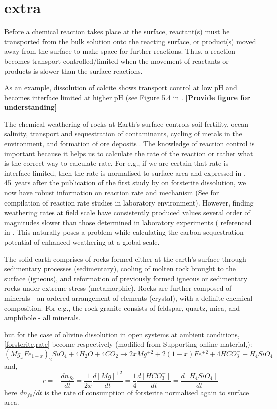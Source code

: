 \chapter{extra}
Before a chemical reaction takes place at the surface, reactant(s) must be transported from the bulk solution onto the reacting surface, or product(s) moved away from the surface to make space for further reactions. Thus, a reaction becomes transport controlled/limited when the movement of reactants or products is slower than the surface reactions.

As an example, dissolution of calcite shows transport control at low pH and becomes interface limited at higher pH (see Figure 5.4 in \cite{Brantley2008b}. \textbf{ [Provide figure for understanding]}

The chemical weathering of rocks at Earth's surface controls soil fertility, ocean salinity, transport and sequestration of contaminants, cycling of metals in the environment, and formation of ore deposits \citep{hellmann2012}.
The knowledge of reaction control is important because it helps us to calculate the rate of the reaction or rather what is the correct way to calculate rate. For e.g., if we are certain that rate is interface limited, then the rate is normalised to surface area and expressed in \citep{Brantley2008c}. \SI{45}{years} after the publication of the first study by \cite{luce1972} on forsterite dissolution, we now have robust information on reaction rate and mechanism (See \cite{rimstidt2012} for compilation of reaction rate studies in laboratory environment). However, finding weathering rates at field scale have consistently produced values several order of magnitudes slower than those determined in laboratory experiments (\cite{white1995} referenced in \citep{renforth2015}. This naturally poses a problem while calculating the carbon sequestration potential of enhanced weathering at a global scale.  

The solid earth comprises of rocks formed either at the earth's surface through sedimentary processes (sedimentary), cooling of molten rock brought to the surface (igneous), and reformation of previously formed igneous or sedimentary rocks under extreme stress (metamorphic). Rocks are further composed of minerals - an ordered arrangement of elements (crystal), with a definite chemical composition. For e.g., the rock granite consists of feldspar, quartz, mica, and amphibole - all minerals.

but for the case of olivine dissolution in open systems at ambient conditions, \cref{forsterite,rate} become respectively (modified from Supporting online material,\cite{rimstidt2012}):
\begin{equation} \label{eq:olivine_diss}
(Mg_{x}Fe_{1-x})_{2}SiO_{4}+4H_2O+4CO_2\longrightarrow 2xMg^{+2} +2(1-x)Fe^{+2} + 4HCO_3^- + H_{4}SiO_4 
\end{equation}
and,
\begin{equation} \label{eq:olivine_rate}
r=-\frac{dn_{fo}}{dt}=\frac{1}{2x}\frac{d[Mg]^{+2}}{dt}=\frac{1}{4}\frac{d[HCO_3^-]}{dt}=\frac{d[H_{4}SiO_4]}{dt}
\end{equation}
here $dn_{fo}/dt$ is the rate of consumption of forsterite normalised again to surface area. 


